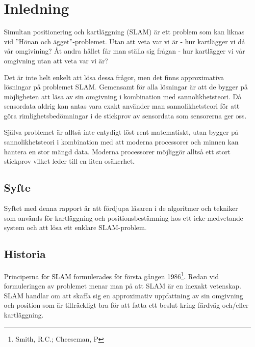 \documentclass[a4paper,12pt,fleqn]{article}
\begin{document}
\addto\captionsswedish{\renewcommand{\contentsname}{Innehållsförteckning}}

\tableofcontents
\thispagestyle{fancy}
\newpage


\section{Inledning}

Simultan positionering och kartläggning (SLAM) är ett problem som kan liknas vid ''Hönan och ägget''-problemet. Utan att veta var vi är - hur kartlägger vi då vår omgivining? Åt andra hållet får man ställa sig frågan - hur kartlägger vi vår omgivning utan att veta var vi är? 

Det är inte helt enkelt att lösa dessa frågor, men det finns approximativa lösningar på problemet SLAM. Gemensamt för alla lösningar är att de bygger på möjligheten att läsa av sin omgivning i kombination med
sannolikhetsteori. Då sensordata aldrig kan antas vara exakt använder man sannolikhetsteori för att göra rimlighetsbedömningar i de stickprov av sensordata som sensorerna ger oss.

Själva problemet är alltså inte entydigt löst rent matematiskt, utan
bygger på sannolikhetsteori i kombination med att moderna processorer
och minnen kan hantera en stor mängd data. Moderna processorer möjliggör
alltså ett stort stickprov vilket leder till en liten osäkerhet.

\subsection{Syfte}
Syftet med denna rapport är att fördjupa läsaren i de algoritmer och tekniker som används för kartläggning och positionsbestämning hos ett icke-medvetande system och att lösa ett enklare SLAM-problem.

\subsection{Historia}

Principerna för SLAM formulerades för första gången 1986\footnote{Smith, R.C.; Cheeseman, P}. Redan vid formuleringen av problemet menar man på att SLAM är en inexakt vetenskap. SLAM handlar om att skaffa sig en approximativ uppfattning av sin omgivning och position som är tillräckligt bra för att fatta ett beslut kring färdväg och/eller kartläggning. 
\end{document}
